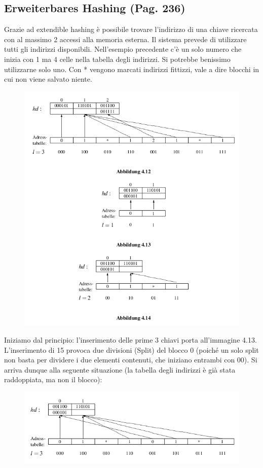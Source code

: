 \documentclass[a4paper]{book}
\begin{document}
\subsection{Erweiterbares Hashing (Pag. 236)}
Grazie ad extendible hashing è possibile trovare l'indirizzo di una chiave ricercata con al massimo 2 accessi alla memoria esterna. Il sistema prevede di utilizzare tutti gli indirizzi disponibili. Nell'esempio precedente c'è un solo numero che inizia con 1 ma 4 celle nella tabella degli indirizzi. Si potrebbe benissimo utilizzarne solo uno. Con * vengono marcati indirizzi fittizzi, vale a dire blocchi in cui non viene salvato niente. 
\begin{figure}[H]
\centering
\includegraphics[scale=0.5]{Figures/erha1.png}
\end{figure}
Iniziamo dal principio: l'inserimento delle prime 3 chiavi porta all'immagine 4.13. L'inserimento di 15 provoca due divisioni (Split) del blocco 0 (poiché un solo split non basta per dividere i due elementi contenuti, che iniziano entrambi con 00). Si arriva dunque alla seguente situazione (la tabella degli indirizzi è già stata raddoppiata, ma non il blocco):
\begin{figure}[H]
\centering
\includegraphics[scale=0.5]{Figures/erha2.png}
\end{figure}
\end{document}
